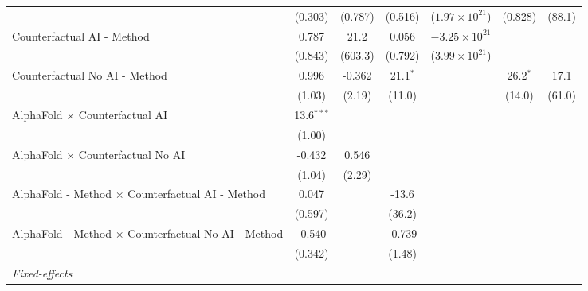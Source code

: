 \begin{tabular}{lcccccc}
                                                              & (0.303)      & (0.787) & (0.516)      & ($1.97\times 10^{21}$)  & (0.828)       & (88.1)\\   
   Counterfactual AI - Method                                 & 0.787        & 21.2    & 0.056        & $-3.25\times 10^{21}$   &               &   \\   
                                                              & (0.843)      & (603.3) & (0.792)      & ($3.99\times 10^{21}$)  &               &   \\   
   Counterfactual No AI - Method                              & 0.996        & -0.362  & 21.1$^{*}$   &                         & 26.2$^{*}$    & 17.1\\   
                                                              & (1.03)       & (2.19)  & (11.0)       &                         & (14.0)        & (61.0)\\   
   AlphaFold $\times$ Counterfactual AI                       & 13.6$^{***}$ &         &              &                         &               &   \\   
                                                              & (1.00)       &         &              &                         &               &   \\   
   AlphaFold $\times$ Counterfactual No AI                    & -0.432       & 0.546   &              &                         &               &   \\   
                                                              & (1.04)       & (2.29)  &              &                         &               &   \\   
   AlphaFold - Method $\times$ Counterfactual AI - Method     & 0.047        &         & -13.6        &                         &               &   \\   
                                                              & (0.597)      &         & (36.2)       &                         &               &   \\   
   AlphaFold - Method $\times$ Counterfactual No AI - Method  & -0.540       &         & -0.739       &                         &               &   \\   
                                                              & (0.342)      &         & (1.48)       &                         &               &   \\   
   \midrule
   \emph{Fixed-effects}\\

\end{tabular}
